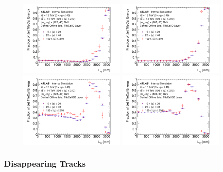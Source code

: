 \begin{figure}[hbtp]
\begin{center}
\includegraphics[width=0.47\textwidth]{figures/caloratio1.png}
\includegraphics[width=0.47\textwidth]{figures/caloratio2.png}\\
\includegraphics[width=0.47\textwidth]{figures/caloratio3.png}
\includegraphics[width=0.47\textwidth]{figures/caloratio4.png}\\
\caption{ }
\label{fig:Caloratio}
\end{center}
\end{figure}



\subsubsection{Disappearing Tracks} 

